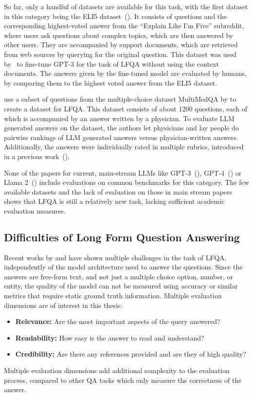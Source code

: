 So far, only a handful of datasets are available for this task, with the first dataset in this category being the ELI5 dataset~(\cite{fan:2019:ELI5}).
It consists of questions and the corresponding highest-voted answer from the ``Explain Like I'm Five'' subreddit, where users ask questions about complex topics, which are then answered by other users.
They are accompanied by support documents, which are retrieved from web sources by querying for the original question.
This dataset was used by~\cite{nakano:2021:Webgpt} to fine-tune GPT-3 for the task of LFQA without using the context documents.
The answers given by the fine-tuned model are evaluated by humans, by comparing them to the highest voted answer from the ELI5 dataset.

\cite{singhal:2023:Towards} use a subset of questions from the multiple-choice dataset MultiMedQA by \cite{singhal:2022:Large} to create a dataset for LFQA.
This dataset consists of about 1200 questions, each of which is accompanied by an answer written by a physician.
To evaluate LLM generated answers on the dataset, the authors let physicians and lay people do pairwise rankings of LLM generated answers versus physician-written answers.
Additionally, the answers were individually rated in multiple rubrics, introduced in a previous work~(\cite{singhal:2022:Large}).

None of the papers for current, main-stream LLMs like GPT-3~(\cite{brown:2020:Language}), GPT-4~(\cite{openai:2023:GPT}) or Llama 2~(\cite{touvron:2023:Llama}) include evaluations on common benchmarks for this category.
The few available datasets and the lack of evaluation on those in main stream papers shows that LFQA is still a relatively new task, lacking sufficient academic evaluation measures.

\subsection{Difficulties of Long Form Question Answering}\label{sec:long-form-qa-difficulties}
Recent works by \cite{xu:2023:A} and \cite{krishna:2021:Hurdles} have shown multiple challenges in the task of LFQA, independently of the model architecture used to answer the questions.
Since the answers are free-form text, and not just a multiple choice option, number, or entity, the quality of the model can not be measured using accuracy or similar metrics that require static ground truth information.
Multiple evaluation dimensions are of interest in this thesis:
\begin{itemize}
    \item \textbf{Relevance:} Are the most important aspects of the query answered?
    \item \textbf{Readability:} How easy is the answer to read and understand?
    \item \textbf{Credibility:} Are there any references provided and are they of high quality?
\end{itemize}
Multiple evaluation dimensions add additional complexity to the evaluation process, compared to other QA tasks which only measure the correctness of the answer.


